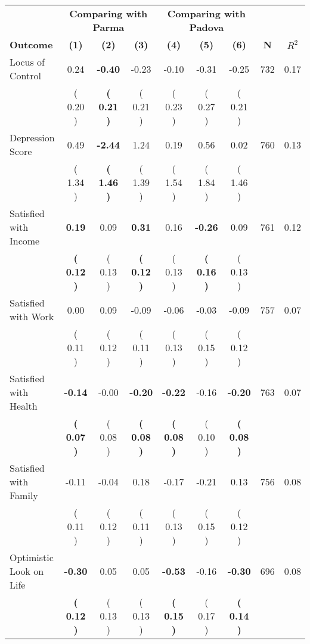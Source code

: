\begin{tabular}{lcccccccc}
\toprule
 & \multicolumn{3}{c}{\textbf{Comparing with Parma}} & \multicolumn{3}{c}{\textbf{Comparing with Padova}} & \\
\cmidrule(lr){2-4} \cmidrule(lr){5-7} 
 \textbf{Outcome} & \textbf{(1)} & \textbf{(2)} & \textbf{(3)} & \textbf{(4)} & \textbf{(5)} & \textbf{(6)} & \textbf{N} & \textbf{$ R^2$} \\
\midrule
Locus of Control &      0.24 & \textbf{    -0.40} &     -0.23 &     -0.10 &     -0.31 &     -0.25 & 732 &       0.17 \\ 
 & (     0.20 ) & \textbf{(     0.21 )} & (     0.21 ) & (     0.23 ) & (     0.27 ) & (     0.21 ) & \\
Depression Score &      0.49 & \textbf{    -2.44} &      1.24 &      0.19 &      0.56 &      0.02 & 760 &       0.13 \\ 
 & (     1.34 ) & \textbf{(     1.46 )} & (     1.39 ) & (     1.54 ) & (     1.84 ) & (     1.46 ) & \\
Satisfied with Income & \textbf{     0.19} &      0.09 & \textbf{     0.31} &      0.16 & \textbf{    -0.26} &      0.09 & 761 &       0.12 \\ 
 & \textbf{(     0.12 )} & (     0.13 ) & \textbf{(     0.12 )} & (     0.13 ) & \textbf{(     0.16 )} & (     0.13 ) & \\
Satisfied with Work &      0.00 &      0.09 &     -0.09 &     -0.06 &     -0.03 &     -0.09 & 757 &       0.07 \\ 
 & (     0.11 ) & (     0.12 ) & (     0.11 ) & (     0.13 ) & (     0.15 ) & (     0.12 ) & \\
Satisfied with Health & \textbf{    -0.14} &     -0.00 & \textbf{    -0.20} & \textbf{    -0.22} &     -0.16 & \textbf{    -0.20} & 763 &       0.07 \\ 
 & \textbf{(     0.07 )} & (     0.08 ) & \textbf{(     0.08 )} & \textbf{(     0.08 )} & (     0.10 ) & \textbf{(     0.08 )} & \\
Satisfied with Family &     -0.11 &     -0.04 &      0.18 &     -0.17 &     -0.21 &      0.13 & 756 &       0.08 \\ 
 & (     0.11 ) & (     0.12 ) & (     0.11 ) & (     0.13 ) & (     0.15 ) & (     0.12 ) & \\
Optimistic Look on Life & \textbf{    -0.30} &      0.05 &      0.05 & \textbf{    -0.53} &     -0.16 & \textbf{    -0.30} & 696 &       0.08 \\ 
 & \textbf{(     0.12 )} & (     0.13 ) & (     0.13 ) & \textbf{(     0.15 )} & (     0.17 ) & \textbf{(     0.14 )} & \\

\end{tabular}

